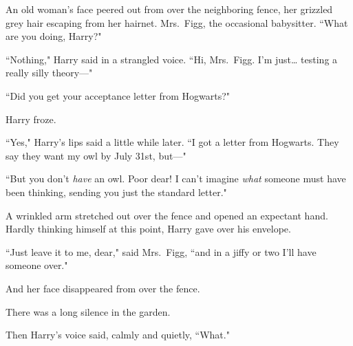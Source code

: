 An old woman's face peered out from over the neighboring fence, her grizzled grey hair escaping from her hairnet. Mrs.~Figg, the occasional babysitter. ``What are you doing, Harry?"

``Nothing," Harry said in a strangled voice. ``Hi, Mrs.~Figg. I'm just{\ldots} testing a really silly theory---"

``Did you get your acceptance letter from Hogwarts?"

Harry froze.

``Yes," Harry's lips said a little while later. ``I got a letter from Hogwarts. They say they want my owl by July 31st, but---"

``But you don't \emph{have} an owl. Poor dear! I can't imagine \emph{what} someone must have been thinking, sending you just the standard letter."

A wrinkled arm stretched out over the fence and opened an expectant hand. Hardly thinking himself at this point, Harry gave over his envelope.

``Just leave it to me, dear," said Mrs.~Figg, ``and in a jiffy or two I'll have someone over."

And her face disappeared from over the fence.

There was a long silence in the garden.

Then Harry's voice said, calmly and quietly, ``What."

